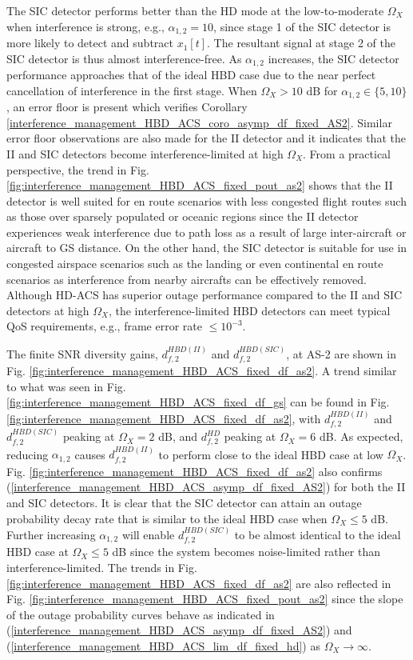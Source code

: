 The SIC detector performs better than the HD mode at the low-to-moderate $\Omega_X$ when interference is strong, e.g., $\alpha_{1,2}=10$, since stage 1 of the SIC detector is more likely to detect and subtract $x_1[t]$. The resultant signal at stage 2 of the SIC detector is thus almost interference-free. As $\alpha_{1,2}$ increases, the SIC detector performance approaches that of the ideal HBD case due to the near perfect cancellation of interference in the first stage. When $\Omega_X>10$ dB for $\alpha_{1,2}\in\{5,10\}$, an error floor is present which verifies Corollary \ref{interference_management_HBD_ACS_coro_asymp_df_fixed_AS2}. Similar error floor observations are also made for the II detector and it indicates that the II and SIC detectors become interference-limited at high $\Omega_X$. From a practical perspective, the trend in Fig. \ref{fig:interference_management_HBD_ACS_fixed_pout_as2} shows that the II detector is well suited for en route scenarios with less congested flight routes such as those over sparsely populated or oceanic regions since the II detector experiences weak interference due to path loss as a result of large inter-aircraft or aircraft to GS distance. On the other hand, the SIC detector is suitable for use in congested airspace scenarios such as the landing or even continental en route scenarios as interference from nearby aircrafts can be effectively removed. Although HD-ACS has superior outage performance compared to the II and SIC detectors at high $\Omega_X$, the interference-limited HBD detectors can meet typical QoS requirements, e.g., frame error rate $\leq 10^{-3}$.

The finite SNR diversity gains, $d_{f,2}^{HBD(II)}$ and $d_{f,2}^{HBD(SIC)}$, at AS-2 are shown in Fig. \ref{fig:interference_management_HBD_ACS_fixed_df_as2}. A trend similar to what was seen in Fig. \ref{fig:interference_management_HBD_ACS_fixed_df_gs} can be found in Fig. \ref{fig:interference_management_HBD_ACS_fixed_df_as2}, with $d_{f,2}^{HBD(II)}$ and $d_{f,2}^{HBD(SIC)}$ peaking at $\Omega_X=2$ dB, and $d_{f,2}^{HD}$ peaking at $\Omega_X=6$ dB. As expected, reducing $\alpha_{1,2}$ causes $d_{f,2}^{HBD(II)}$ to perform close to the ideal HBD case at low $\Omega_X$. Fig. \ref{fig:interference_management_HBD_ACS_fixed_df_as2} also confirms (\ref{interference_management_HBD_ACS_asymp_df_fixed_AS2}) for both the II and SIC detectors. It is clear that the SIC detector can attain an outage probability decay rate that is similar to the ideal HBD case when $\Omega_X\leq5$ dB. Further increasing $\alpha_{1,2}$ will enable $d_{f,2}^{HBD(SIC)}$ to be almost identical to the ideal HBD case at $\Omega_X\leq5$ dB since the system becomes noise-limited rather than interference-limited. The trends in Fig. \ref{fig:interference_management_HBD_ACS_fixed_df_as2} are also reflected in Fig. \ref{fig:interference_management_HBD_ACS_fixed_pout_as2} since the slope of the outage probability curves behave as indicated in (\ref{interference_management_HBD_ACS_asymp_df_fixed_AS2}) and (\ref{interference_management_HBD_ACS_lim_df_fixed_hd}) as $\Omega_X \to \infty$.

